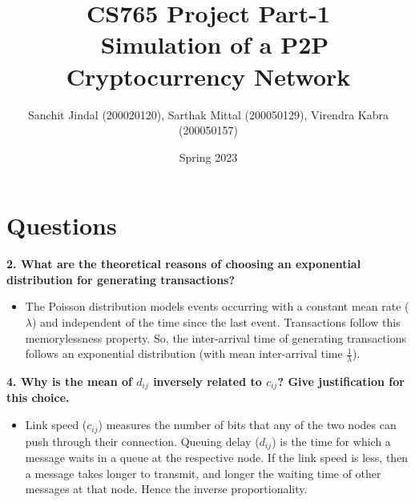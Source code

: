 \documentclass{article}
\title{\textbf{CS765 Project Part-1 \\ {\ Simulation of a P2P Cryptocurrency Network}}}
\author{Sanchit Jindal (200020120), Sarthak Mittal (200050129), Virendra Kabra (200050157)}
\date{Spring 2023}
\newcommand{\B}[1]{\textbf{#1}}
\begin{document}
\begin{sloppypar}       %

    \maketitle
    \tableofcontents
    \thispagestyle{empty}

    \newpage

    \section{Questions}
        
    \noindent \B{2. What are the theoretical reasons of choosing an exponential distribution for generating transactions?}
    \begin{itemize}
        \item The Poisson distribution models events occurring with a constant mean rate ($\lambda$) and independent of the time since the last event. Transactions follow this memorylessness property. So, the inter-arrival time of generating transactions follows an exponential distribution (with mean inter-arrival time $\frac{1}{\lambda}$).
    \end{itemize}

    \noindent \B{4. Why is the mean of $d_{ij}$ inversely related to $c_{ij}$? Give justification for this choice.}
    \begin{itemize}
        \item Link speed ($c_{ij}$) measures the number of bits that any of the two nodes can push through their connection. Queuing delay ($d_{ij}$) is the time for which a message waits in a queue at the respective node. If the link speed is less, then a message takes longer to transmit, and longer the waiting time of other messages at that node. Hence the inverse proportionality.
    \end{itemize}

\end{sloppypar}
\end{document}
